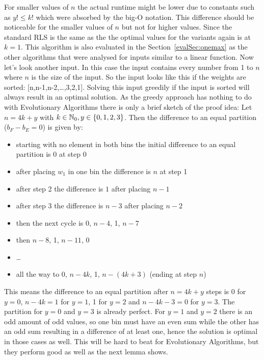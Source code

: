 For smaller values of $n$ the actual runtime might be lower due to constants such as $y!\le k!$ which were absorbed by the big-O notation.
This difference should be noticeable for the smaller values of $n$ but not for higher values.
Since the standard RLS is the same as the \RLSN[1] the optimal values for the \RLSN[k] variants again is at $k=1$.
This algorithm is also evaluated in the Section~\ref{evalSec:onemax} as the other algorithms that were analysed for inputs similar to a linear function.\newline
Now let's look another input.
In this case the input contains every number from 1 to $n$ where $n$ is the size of the input.
So the input looks like this if the weights are sorted: [n,n-1,n-2,\dots,3,2,1].
Solving this input greedily if the input is sorted will always result in an optimal solution.
As the greedy approach has nothing to do with Evolutionary Algorithms there is only a brief sketch of the proof idea:\newline
Let $n=4k+y$ with $k\in \mathbb{N}_0, y \in\{0,1,2,3\}$. Then the difference to an equal partition ($b_F-b_E=0$) is given by:
\begin{itemize}
    \item starting with no element in both bins the initial difference to an equal partition is 0 at step 0
    \item after placing $w_1$ in one bin the difference is $n$ at step 1
    \item after step 2 the difference is $1$ after placing $n-1$
    \item after step 3 the difference is $n-3$ after placing $n-2$
    \item then the next cycle is 0, $n-4$, 1, $n-7$
    \item then $n-8$, 1, $n-11$, 0
    \item \dots
    \item all the way to 0, $n-4k$, 1, $n-(4k+3)$ (ending at step $n$)
\end{itemize}
This means the difference to an equal partition after $n=4k+y$ steps is 0 for $y=0$, $n-4k=1$ for $y=1$, 1 for $y=2$ and $n-4k-3=0$ for $y=3$.
The partition for $y=0$ and $y=3$ is already perfect.
For $y=1$ and $y=2$ there is an odd amount of odd values, so one bin must have an even sum while the other has an odd sum resulting in a difference of at least one, hence the solution is optimal in those cases as well.\newline
This will be hard to beat for Evolutionary Algorithms, but they perform good as well as the next lemma shows.

